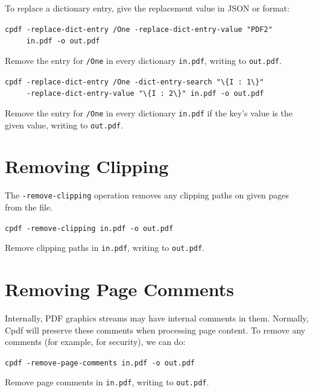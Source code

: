 \documentclass{book}
\begin{document}
\noindent To replace a dictionary entry, give the replacement value in JSON or format:

  \begin{framed}
  \small\noindent\verb!cpdf -replace-dict-entry /One -replace-dict-entry-value "PDF2"!\\
  \small\noindent\verb!     in.pdf -o out.pdf!

  \vspace{2.5mm}
  \noindent Remove the entry for \texttt{/One} in every dictionary \texttt{in.pdf}, writing to \texttt{out.pdf}. 

  \vspace{2.5mm}

  \small\noindent\verb!cpdf -replace-dict-entry /One -dict-entry-search "\{I : 1\}"!\\
  \small\noindent\verb!     -replace-dict-entry-value "\{I : 2\}" in.pdf -o out.pdf!

  \vspace{2.5mm}
  \noindent Remove the entry for \texttt{/One} in every dictionary \texttt{in.pdf} if the key's value is the given value, writing to \texttt{out.pdf}. 
  \end{framed}

\section{Removing Clipping}

The \texttt{-remove-clipping} operation removes any clipping paths on given pages from the file.

  \begin{framed}
  \small\noindent\verb!cpdf -remove-clipping in.pdf -o out.pdf!

  \vspace{2.5mm}
  \noindent Remove clipping paths in \texttt{in.pdf}, writing to \texttt{out.pdf}. 
  \end{framed}

\section{Removing Page Comments}

Internally, PDF graphics streams may have internal comments in them. Normally, Cpdf will preserve these comments when processing page content. To remove any comments (for example, for security), we can do:

  \begin{framed}
  \small\noindent\verb!cpdf -remove-page-comments in.pdf -o out.pdf!

  \vspace{2.5mm}
  \noindent Remove page comments in \texttt{in.pdf}, writing to \texttt{out.pdf}. 
  \end{framed}
\end{document}
